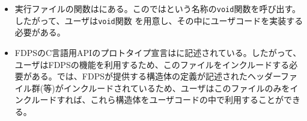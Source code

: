 \begin{itemize}[leftmargin=*]
\item 実行ファイルの関数はにある。このではという名称の\texttt{void}関数を呼び出す。したがって、ユーザは\texttt{void}関数 を用意し、その中にユーザコードを実装する必要がある。
\item FDPSのC言語用APIのプロトタイプ宣言はに記述されている。したがって、ユーザはFDPSの機能を利用するため、このファイルをインクルードする必要がある。では、FDPSが提供する構造体の定義が記述されたヘッダーファイル群(等)がインクルードされているため、ユーザはこのファイルのみをインクルードすれば、これら構造体をユーザコードの中で利用することができる。
\end{itemize}


